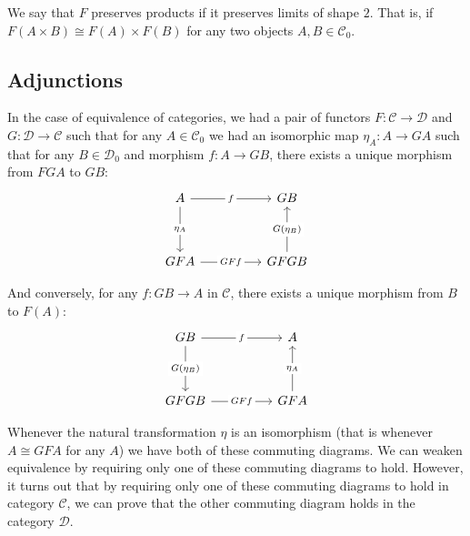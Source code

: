 \begin{example}
    We say that $F$ preserves products if it preserves limits of shape $\mathcal{2}$.
    That is, if $F(A\times B)\cong F(A)\times F(B)$ for any two objects $A,B\in\mathcal{C}_0$.
\end{example}

\subsection{Adjunctions}
In the case of equivalence of categories, we had a pair of functors
$F:\mathcal{C}\to\mathcal{D}$ and $G:\mathcal{D}\to\mathcal{C}$
such that for any $A\in\mathcal{C}_0$
we had an isomorphic map $\eta_A:A\to G A$
such that
for any $B\in\mathcal{D}_0$
and morphism $f:A\to GB$,
there exists a unique morphism from $FGA$ to $GB$:
\[\begin{tikzcd}
	A && GB \\
	\\
	GFA && GFGB
	\arrow["f"{description}, from=1-1, to=1-3]
	\arrow["{\eta_A}"{description}, from=1-1, to=3-1]
	\arrow["GFf"{description}, from=3-1, to=3-3]
	\arrow["{G(\eta_B)}"{description}, from=3-3, to=1-3]
\end{tikzcd}\]

And conversely, for any $f:GB\to A$ in $\mathcal{C}$,
there exists a unique morphism from $B$ to $F(A)$:
\[\begin{tikzcd}
    {GB} && A \\
    \\
    {GFGB} && {GFA}
    \arrow["f"{description}, from=1-1, to=1-3]
    \arrow["{G(\eta_B)}"{description}, from=1-1, to=3-1]
    \arrow["GFf"{description}, from=3-1, to=3-3]
    \arrow["{\eta_A}"{description}, from=3-3, to=1-3]
\end{tikzcd}\]

Whenever the natural transformation $\eta$ is an isomorphism (that is whenever $A\cong GF A$ for any $A$)
we have both of these commuting diagrams.
We can weaken equivalence by requiring only one of these commuting diagrams to hold.
However, it turns out that by requiring only one of these commuting diagrams to hold 
in category $\mathcal{C}$,
we can prove that the other commuting diagram holds in the category $\mathcal{D}$.

